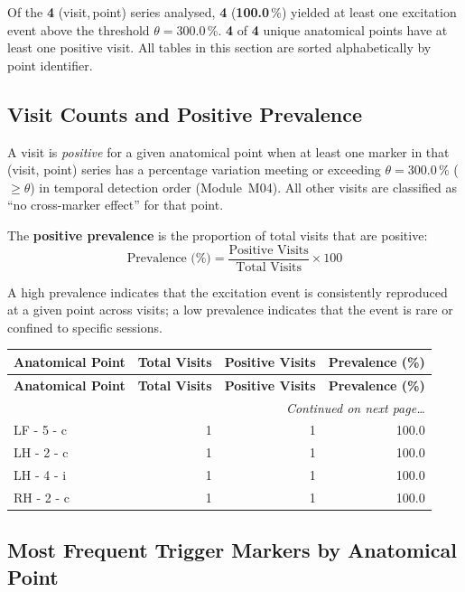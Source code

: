 \documentclass[a4paper,11pt]{article}
\begin{document}
\noindent
Of the \textbf{4} (visit,\,point) series analysed,
\textbf{4} (\textbf{100.0}\,\%) yielded at least one
excitation event above the threshold $\theta = 300.0\,\%$.
\textbf{4} of \textbf{4} unique anatomical points
have at least one positive visit.
All tables in this section are sorted alphabetically by point identifier.

\subsection{Visit Counts and Positive Prevalence}

A visit is \emph{positive} for a given anatomical point when at least one marker in that
(visit, point) series has a percentage variation meeting or exceeding
$\theta = 300.0\,\%$ ($\geq \theta$) in temporal detection order (Module~M04).
All other visits are classified as ``no cross-marker effect'' for that point.

The \textbf{positive prevalence} is the proportion of total visits that are positive:
\[
  \text{Prevalence (\%)} = \frac{\text{Positive Visits}}{\text{Total Visits}} \times 100
\]

A high prevalence indicates that the excitation event is consistently reproduced at a given
point across visits; a low prevalence indicates that the event is rare or confined to
specific sessions.

\begin{small}
\begin{longtable}{p{5cm}rrr}
\toprule
\textbf{Anatomical Point} &
\textbf{Total Visits} &
\textbf{Positive Visits} &
\textbf{Prevalence (\%)} \\
\midrule
\endfirsthead
\toprule
\textbf{Anatomical Point} &
\textbf{Total Visits} &
\textbf{Positive Visits} &
\textbf{Prevalence (\%)} \\
\midrule
\endhead
\midrule
\multicolumn{4}{r}{\small\emph{Continued on next page\ldots}} \\
\endfoot
\bottomrule
\endlastfoot
LF - 5 - c & 1 & 1 & 100.0 \\
LH - 2 - c & 1 & 1 & 100.0 \\
LH - 4 - i & 1 & 1 & 100.0 \\
RH - 2 - c & 1 & 1 & 100.0 \\
\end{longtable}
\end{small}

\subsection{Most Frequent Trigger Markers by Anatomical Point}
\end{document}
